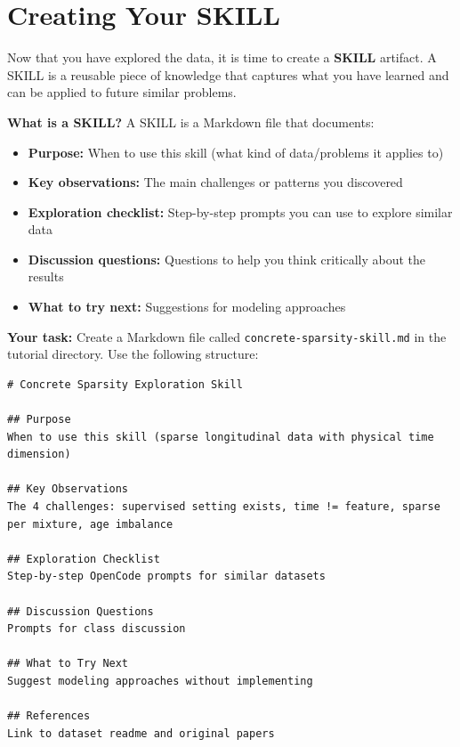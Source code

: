 \documentclass[11pt]{article}
\begin{document}
\section{Creating Your SKILL}
\label{sec:skill}

Now that you have explored the data, it is time to create a \textbf{SKILL} artifact.  A SKILL is a reusable piece of knowledge that captures what you have learned and can be applied to future similar problems.

\begin{def-box}
\textbf{What is a SKILL?}  A SKILL is a Markdown file that documents:
\begin{itemize}[nosep]
  \item \textbf{Purpose:} When to use this skill (what kind of data/problems it applies to)
  \item \textbf{Key observations:} The main challenges or patterns you discovered
  \item \textbf{Exploration checklist:} Step-by-step prompts you can use to explore similar data
  \item \textbf{Discussion questions:} Questions to help you think critically about the results
  \item \textbf{What to try next:} Suggestions for modeling approaches
\end{itemize}
\end{def-box}

\textbf{Your task:} Create a Markdown file called \texttt{concrete-sparsity-skill.md} in the tutorial directory.  Use the following structure:

\begin{lstlisting}[style=term]
# Concrete Sparsity Exploration Skill

## Purpose
When to use this skill (sparse longitudinal data with physical time dimension)

## Key Observations
The 4 challenges: supervised setting exists, time != feature, sparse per mixture, age imbalance

## Exploration Checklist
Step-by-step OpenCode prompts for similar datasets

## Discussion Questions
Prompts for class discussion

## What to Try Next
Suggest modeling approaches without implementing

## References
Link to dataset readme and original papers
\end{lstlisting}
\end{document}
